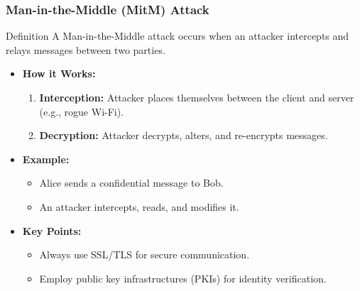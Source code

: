 \documentclass{beamer}
\begin{document}
\begin{frame}[fragile]
    \frametitle{Man-in-the-Middle (MitM) Attack}
    
    \begin{block}{Definition}
        A Man-in-the-Middle attack occurs when an attacker intercepts and relays messages between two parties.
    \end{block}
    
    \begin{itemize}
        \item \textbf{How it Works:}
            \begin{enumerate}
                \item \textbf{Interception:} Attacker places themselves between the client and server (e.g., rogue Wi-Fi).
                \item \textbf{Decryption:} Attacker decrypts, alters, and re-encrypts messages.
            \end{enumerate}
        \item \textbf{Example:} 
            \begin{itemize}
                \item Alice sends a confidential message to Bob.
                \item An attacker intercepts, reads, and modifies it.
            \end{itemize}
        \item \textbf{Key Points:}
            \begin{itemize}
                \item Always use SSL/TLS for secure communication.
                \item Employ public key infrastructures (PKIs) for identity verification.
            \end{itemize}
    \end{itemize}
\end{frame}
\end{document}
